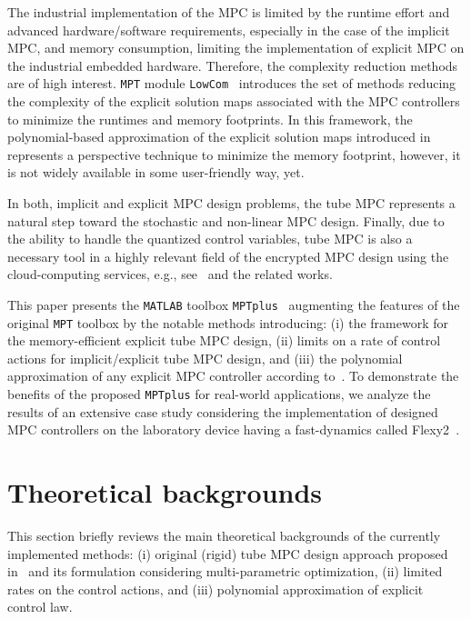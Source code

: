 \documentclass[letterpaper, 10 pt, conference]{ieeeconf}
\begin{document}
	The industrial implementation of the MPC is limited by the runtime effort and advanced hardware/software requirements, especially in the case of the implicit MPC, and memory consumption, limiting the implementation of explicit MPC on the industrial embedded hardware. Therefore, the complexity reduction methods are of high interest. 
	\texttt{MPT} module \texttt{LowCom}~\cite{KH15} introduces the set of methods reducing the complexity of the explicit solution maps associated with the MPC controllers to minimize the runtimes and memory footprints. 
	In this framework, the polynomial-based approximation of the explicit solution maps introduced in~\cite{KL11} represents a perspective technique to minimize the memory footprint, however, it is not widely available in some user-friendly way, yet.
	
	In both, implicit and explicit MPC design problems, the tube MPC represents a natural step toward the stochastic and non-linear MPC design. Finally, due to the ability to handle the quantized control variables, tube MPC is also a necessary tool in a highly relevant field of the encrypted MPC design using the cloud-computing services, e.g., see~\cite{DR18} and the related works.
	
	This paper presents the \texttt{MATLAB} toolbox \texttt{MPTplus}~\cite{MPTplus} augmenting the features of the original \texttt{MPT} toolbox by the notable methods introducing: (i) the framework for the memory-efficient explicit tube MPC design, (ii) limits on a rate of control actions for implicit/explicit tube MPC design, and (iii) the polynomial approximation of any explicit MPC controller according to~\cite{KL11}. To demonstrate the benefits of the proposed \texttt{MPTplus} for real-world applications, we analyze the results of an extensive case study considering the implementation of designed MPC controllers on the laboratory device having a fast-dynamics called Flexy2~\cite{CK19}. 
	
	\section{Theoretical backgrounds}
	\label{sec:tube_mpc_theory}
	
	This section briefly reviews the main theoretical backgrounds of the currently implemented methods: (i) original (rigid) tube MPC design approach proposed in~\cite{MS05} and its formulation considering multi-parametric optimization, (ii) limited rates on the control actions, and (iii) polynomial approximation of explicit control law.
	
\end{document}

